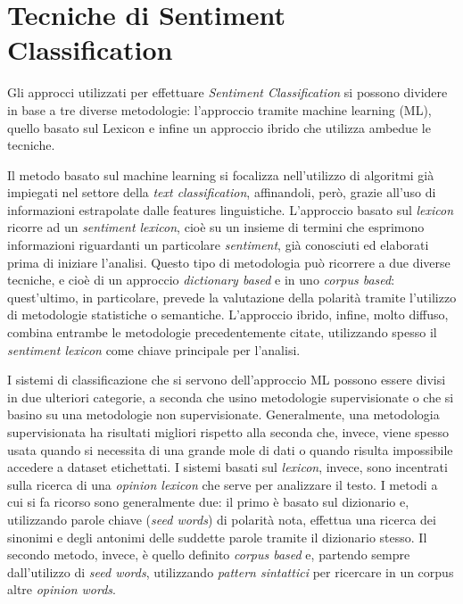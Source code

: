 \documentclass[a4paper,12pt,openright,twoside]{report}
\theoremstyle{definition}
\begin{document}
\section{Tecniche di Sentiment Classification}
\label{sec:tecniche}
Gli approcci utilizzati per effettuare \emph{Sentiment Classification}
si possono dividere in base a tre diverse metodologie: l'approccio tramite
machine learning (ML), quello basato sul Lexicon e infine un approccio ibrido
che utilizza ambedue le tecniche.

Il metodo basato sul machine learning si focalizza nell'utilizzo di algoritmi
già impiegati nel settore della \emph{text classification}, affinandoli, però, grazie all'uso 
di informazioni estrapolate dalle features linguistiche.
L'approccio basato sul \emph{lexicon} ricorre ad un \emph{sentiment lexicon},
cioè su un insieme di termini che esprimono informazioni riguardanti un particolare
\emph{sentiment}, già conosciuti ed elaborati prima di iniziare l'analisi.
Questo tipo di metodologia può ricorrere a due diverse tecniche,
e cioè di 
un approccio \emph{dictionary based} e in uno \emph{corpus based}:
quest'ultimo, in particolare, prevede la valutazione della polarità
tramite l'utilizzo di metodologie statistiche o
semantiche.
L'approccio ibrido, infine, molto diffuso, combina entrambe le metodologie precedentemente
citate, utilizzando spesso il \emph{sentiment lexicon} come chiave principale per l'analisi.

I sistemi di classificazione che  si servono dell'approccio ML possono essere 
divisi in due ulteriori categorie, a seconda che usino metodologie supervisionate
o che si basino su una metodologie non supervisionate. Generalmente, una metodologia
supervisionata ha risultati migliori rispetto alla seconda che, invece,
viene spesso usata quando si necessita di una grande mole di dati o quando risulta
impossibile accedere a dataset etichettati.
I sistemi basati sul \emph{lexicon}, invece, sono incentrati sulla ricerca di una \emph{opinion lexicon}
che serve per analizzare il testo. I metodi a cui si fa ricorso sono generalmente due:
il primo è basato sul dizionario e, utilizzando parole chiave (\emph{seed words}) di polarità nota,
effettua una ricerca dei sinonimi e degli antonimi delle suddette parole tramite il dizionario stesso.
Il secondo metodo, invece, è quello definito \emph{corpus based} e, partendo sempre dall'utilizzo di
\emph{seed words}, utilizzando \emph{pattern sintattici} per 
ricercare in un corpus altre \emph{opinion words}.
\end{document}
